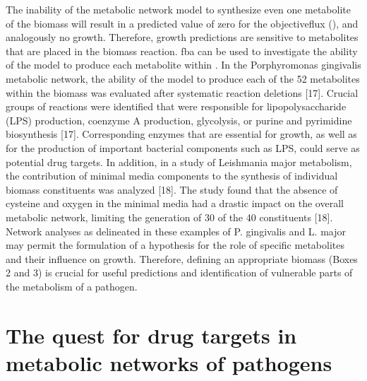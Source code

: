 The inability of the metabolic network model to synthesize even one 
metabolite of the \gls{biomass} will result in a predicted value 
of zero for the \gls{objectiveflux} (), and analogously no growth. 
Therefore, growth predictions are sensitive to metabolites that are 
placed in the \gls{biomass} reaction. \gls{fba} can be used to investigate the 
ability of the model to produce each metabolite within . In 
the Porphyromonas gingivalis metabolic network, the ability of the 
model to produce each of the 52 metabolites within the \gls{biomass} 
was evaluated after systematic reaction deletions [17]. 
Crucial groups of reactions were identified that were responsible for 
lipopolysaccharide (LPS) production, coenzyme A production, glycolysis, 
or purine and pyrimidine biosynthesis [17]. Corresponding enzymes that 
are essential for growth, as well as for the production of important 
bacterial components such as LPS, could serve as potential drug 
targets. In addition, in a study of Leishmania major metabolism, 
the contribution of minimal media components to the synthesis of 
individual \gls{biomass} constituents was analyzed [18]. The study found 
that the absence of cysteine and oxygen in the minimal media had a 
drastic impact on the overall metabolic network, limiting the 
generation of 30 of the 40  constituents [18]. Network analyses 
as delineated in these examples of P. gingivalis and L. major may 
permit the formulation of a hypothesis for the role of specific 
metabolites and their influence on growth. Therefore, defining an 
appropriate \gls{biomass} (Boxes 2 and 3) is crucial for useful 
predictions and identification of vulnerable parts of the metabolism 
of a pathogen.

\section{The quest for drug targets in metabolic networks of pathogens}

